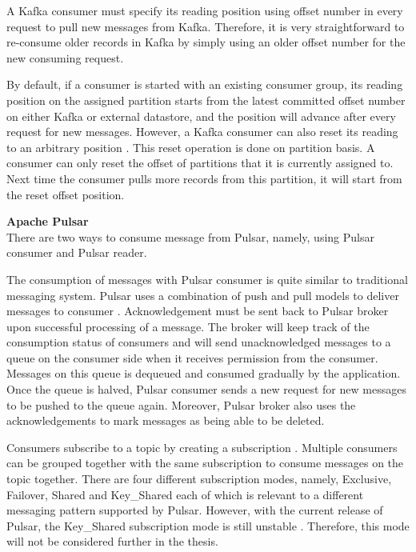 A Kafka consumer must specify its reading position using offset number in every request to pull new messages from Kafka. Therefore, it is very straightforward to re-consume older records in Kafka by simply using an older offset number for the new consuming request. 

By default, if a consumer is started with an existing consumer group, its reading position on the assigned partition starts from the latest committed offset number on either Kafka or external datastore, and the position will advance after every request for new messages. However, a Kafka consumer can also reset its reading to an arbitrary position \cite{kafkaconsumerimplement}. This reset operation is done on partition basis. A consumer can only reset the offset of partitions that it is currently assigned to. Next time the consumer pulls more records from this partition, it will start from the reset offset position.

\large \textbf{Apache Pulsar}\\
\normalsize
There are two ways to consume message from Pulsar, namely, using Pulsar consumer and Pulsar reader.

The consumption of messages with Pulsar consumer is quite similar to traditional messaging system. Pulsar uses a combination of push and pull models to deliver messages to consumer \cite{pulsarbinaryprotocol}. Acknowledgement must be sent back to Pulsar broker upon successful processing of a message. The broker will keep track of the consumption status of consumers and will send unacknowledged messages to a queue on the consumer side when it receives permission from the consumer. Messages on this queue is dequeued and consumed gradually by the application. Once the queue is halved, Pulsar consumer sends a new request for new messages to be pushed to the queue again. Moreover, Pulsar broker also uses the acknowledgements to mark messages as being able to be deleted.

Consumers subscribe to a topic by creating a subscription \cite{pulsarconceptmessaging}. Multiple consumers can be grouped together with the same subscription to consume messages on the topic together. There are four different subscription modes, namely, Exclusive, Failover, Shared and Key\_Shared each of which is relevant to a different messaging pattern supported by Pulsar. However, with the current release of Pulsar, the Key\_Shared subscription mode is still unstable \cite{pulsarkaysharedunstable}. Therefore, this mode will not be considered further in the thesis.

